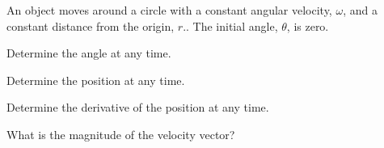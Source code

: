\begin{problem}
\item An object moves around a circle with a constant angular
  velocity, $\omega$, and a constant distance from the origin,
  $r$.. The initial angle, $\theta$, is zero.
  \begin{subproblem}
  \item Determine the angle at any time.
    \vfill
  \item Determine the position at any time.
    \vfill
  \item Determine the derivative of the position at any time.
    \vfill
  \item What is the magnitude of the velocity vector?
    \vfill
  \end{subproblem}
\end{problem}


